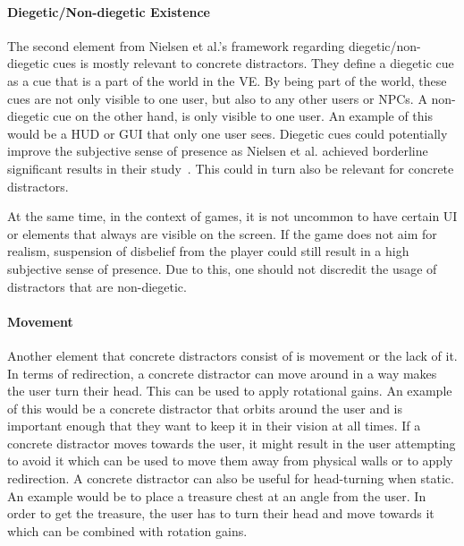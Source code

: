 \paragraph{Diegetic/Non-diegetic Existence}
The second element from Nielsen et al.'s framework regarding diegetic/non-diegetic cues is mostly relevant to concrete distractors. They define a diegetic cue as a cue that is a part of the world in the VE. By being part of the world, these cues are not only visible to one user, but also to any other users or NPCs. A non-diegetic cue on the other hand, is only visible to one user. An example of this would be a HUD or GUI that only one user sees. Diegetic cues could potentially improve the subjective sense of presence as Nielsen et al. achieved borderline significant results in their study~\cite{nielsen2016missing}. This could in turn also be relevant for concrete distractors. 

At the same time, in the context of games, it is not uncommon to have certain UI or elements that always are visible on the screen. If the game does not aim for realism, suspension of disbelief from the player could still result in a high subjective sense of presence. Due to this, one should not discredit the usage of distractors that are non-diegetic.

\paragraph{Movement}
Another element that concrete distractors consist of is movement or the lack of it. In terms of redirection, a concrete distractor can move around in a way makes the user turn their head. This can be used to apply rotational gains. An example of this would be a concrete distractor that orbits around the user and is important enough that they want to keep it in their vision at all times. If a concrete distractor moves towards the user, it might result in the user attempting to avoid it which can be used to move them away from physical walls or to apply redirection. A concrete distractor can also be useful for head-turning when static. An example would be to place a treasure chest at an angle from the user. In order to get the treasure, the user has to turn their head and move towards it which can be combined with rotation gains.

